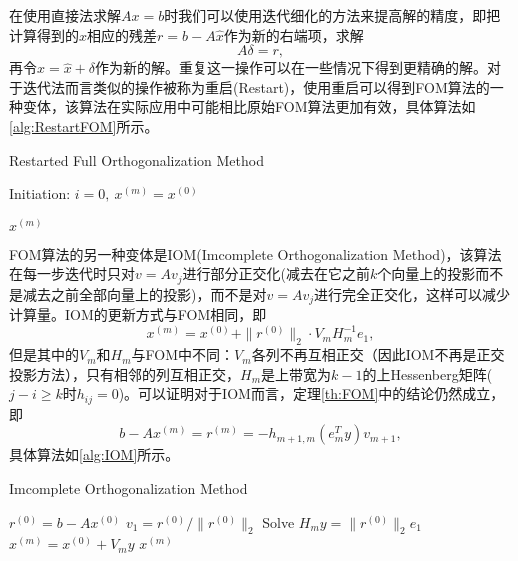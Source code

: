 \documentclass[a4paper,10pt]{ctexart}
\begin{document}
在使用直接法求解$ Ax=b $时我们可以使用迭代细化的方法来提高解的精度，即把计算得到的$ \hat{x} $相应的残差$ r = b-A\hat{x} $作为新的右端项，求解
\[
    A \delta = r,
\]
再令$ x = \hat{x}+\delta $作为新的解。重复这一操作可以在一些情况下得到更精确的解。对于迭代法而言类似的操作被称为重启(Restart)，使用重启可以得到FOM算法的一种变体，该算法在实际应用中可能相比原始FOM算法更加有效，具体算法如\ref{alg:RestartFOM}所示。

\begin{algorithm}[htbp]
    \caption{Restarted Full Orthogonalization Method}\label{alg:RestartFOM}
    Initiation: $ i = 0,\ x^{(m)} = x^{(0)} $\;

    \Return $ x^{(m)} $\;
\end{algorithm}

FOM算法的另一种变体是IOM(Imcomplete Orthogonalization Method)，该算法在每一步迭代时只对$ v = Av_j $进行部分正交化(减去在它之前$ k $个向量上的投影而不是减去之前全部向量上的投影)，而不是对$ v = Av_j $进行完全正交化，这样可以减少计算量。IOM的更新方式与FOM相同，即
\[
    x^{(m)} = x^{(0)} + \| r^{(0)} \|_2 \cdot V_m H_m^{-1}e_1 ,
\]
但是其中的$ V_m $和$ H_m $与FOM中不同：$ V_m $各列不再互相正交（因此IOM不再是正交投影方法），只有相邻的列互相正交，$ H_m $是上带宽为$ k-1 $的上Hessenberg矩阵($ j-i\geqslant k $时$ h_{ij}=0 $)。可以证明对于IOM而言，定理\ref{th:FOM}中的结论仍然成立，即
\[
    b - Ax^{(m)} = r^{(m)} = -h_{m+1,m}(e^T_m y) v_{m+1},
\]
具体算法如\ref{alg:IOM}所示。
\begin{algorithm}[htbp]
    \caption{Imcomplete Orthogonalization Method}\label{alg:IOM}
    $ r^{(0)} = b - Ax^{(0)} $\;
    $ v_1 = r^{(0)} / \| r^{(0)} \|_2 $\;
    Solve $ H_m y = \| r^{(0)} \|_2 e_1 $\;
    $ x^{(m)} = x^{(0)} + V_m y $\;
    \Return $ x^{(m)} $\;
\end{algorithm}
\end{document}
